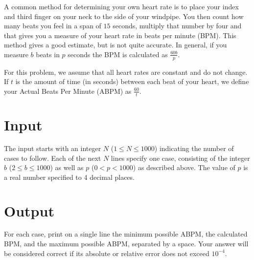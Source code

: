 
A common method for determining your own heart rate is to place your
index and third finger on your neck to the side of your windpipe.  You
then count how many beats you feel in a span of $15$ seconds, multiply
that number by four and that gives you a measure of your heart rate in
beats per minute (BPM).  This method gives a good estimate, but is not
quite accurate. In general, if you measure $b$ beats in $p$ seconds
the BPM is calculated as $\frac{60b}{p}$.

For this problem, we assume that all heart rates are constant and do
not change. If $t$ is the amount of time (in seconds) between each
beat of your heart, we define your Actual Beats Per Minute (ABPM) as
$\frac{60}{t}$.  

\section*{Input}

The input starts with an integer $N$ ($1 \leq N \leq 1000$) indicating the 
number of cases to follow.  Each of the next $N$ lines specify one case, 
consisting of the integer $b$ ($2 \leq b \leq 1000$) as well as $p$ ($0 < 
p < 1000$) as described above.  The value of $p$ is a real number specified 
to 4 decimal places.


\section*{Output}

For each case, print on a single line the minimum possible ABPM, the
calculated BPM, and the maximum possible ABPM, separated by a space.
Your answer will be considered correct if its absolute or relative
error does not exceed $10^{-4}$.
